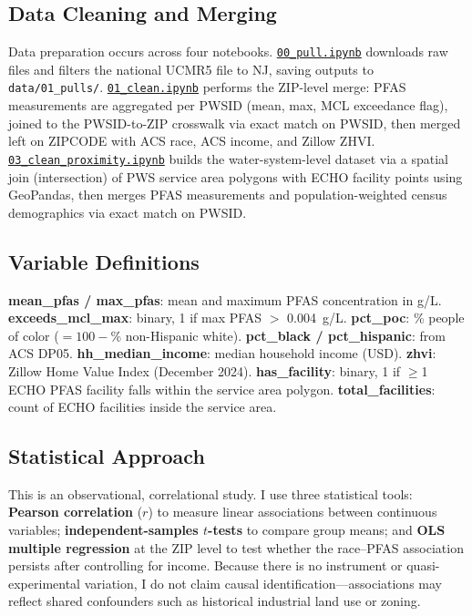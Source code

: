 \documentclass[9pt,twocolumn]{extarticle}
\begin{document}
\subsection{Data Cleaning and Merging}
Data preparation occurs across four notebooks. \href{https://github.com/Charcharbinks28/QSS20-CW-Final/blob/main/code/00_pull.ipynb}{\texttt{00\_pull.ipynb}} downloads raw files and filters the national UCMR5 file to NJ, saving outputs to \texttt{data/01\_pulls/}. \href{https://github.com/Charcharbinks28/QSS20-CW-Final/blob/main/code/01_clean.ipynb}{\texttt{01\_clean.ipynb}} performs the ZIP-level merge: PFAS measurements are aggregated per PWSID (mean, max, MCL exceedance flag), joined to the PWSID-to-ZIP crosswalk via exact match on PWSID, then merged left on ZIPCODE with ACS race, ACS income, and Zillow ZHVI. \href{https://github.com/Charcharbinks28/QSS20-CW-Final/blob/main/code/03_clean_proximity.ipynb}{\texttt{03\_clean\_proximity.ipynb}} builds the water-system-level dataset via a spatial join (intersection) of PWS service area polygons with ECHO facility points using GeoPandas, then merges PFAS measurements and population-weighted census demographics via exact match on PWSID.

\subsection{Variable Definitions}
\textbf{mean\_pfas / max\_pfas}: mean and maximum PFAS concentration in \textmu g/L. \textbf{exceeds\_mcl\_max}: binary, 1 if max PFAS $>$ 0.004~\textmu g/L. \textbf{pct\_poc}: \% people of color ($= 100 - \%$ non-Hispanic white). \textbf{pct\_black / pct\_hispanic}: from ACS DP05. \textbf{hh\_median\_income}: median household income (USD). \textbf{zhvi}: Zillow Home Value Index (December 2024). \textbf{has\_facility}: binary, 1 if $\geq$1 ECHO PFAS facility falls within the service area polygon. \textbf{total\_facilities}: count of ECHO facilities inside the service area.

\subsection{Statistical Approach}
This is an observational, correlational study. I use three statistical tools: \textbf{Pearson correlation} ($r$) to measure linear associations between continuous variables; \textbf{independent-samples $t$-tests} to compare group means; and \textbf{OLS multiple regression} at the ZIP level to test whether the race--PFAS association persists after controlling for income. Because there is no instrument or quasi-experimental variation, I do not claim causal identification---associations may reflect shared confounders such as historical industrial land use or zoning.
\end{document}
